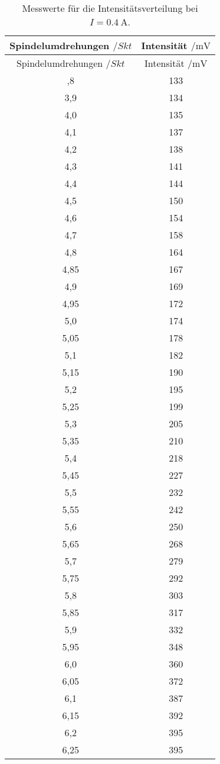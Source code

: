 \begin{longtable}{cc}
  \caption{Messwerte für die Intensitätsverteilung bei $I=\SI{0.4}{\ampere}$.}\\
  \hline
  \toprule
  Spindelumdrehungen $/Skt$ & Intensität $/\si{\milli\volt}$ \\
  \midrule
\endfirsthead
\toprule
Spindelumdrehungen $/Skt$ & Intensität $/\si{\milli\volt}$ \\
\midrule
\endhead
\bottomrule
\endfoot
\bottomrule
\bottomrule
\endlastfoot
3,8  & 133\\
3,9  & 134\\
4,0  & 135\\
4,1  & 137\\
4,2  & 138\\
4,3  & 141\\
4,4  & 144\\
4,5  & 150\\
4,6  & 154\\
4,7  & 158\\
4,8  & 164\\
4,85 & 167\\
4,9  & 169\\
4,95 & 172\\
5,0  & 174\\
5,05 & 178\\
5,1  & 182\\
5,15 & 190\\
5,2  & 195\\
5,25 & 199\\
5,3  & 205\\
5,35 & 210\\
5,4  & 218\\
5,45 & 227\\
5,5  & 232\\
5,55 & 242\\
5,6  & 250\\
5,65 & 268\\
5,7  & 279\\
5,75 & 292\\
5,8  & 303\\
5,85 & 317\\
5,9  & 332\\
5,95 & 348\\
6,0  & 360\\
6,05 & 372\\
6,1  & 387\\
6,15 & 392\\
6,2  & 395\\
6,25 & 395\\

\end{longtable}
